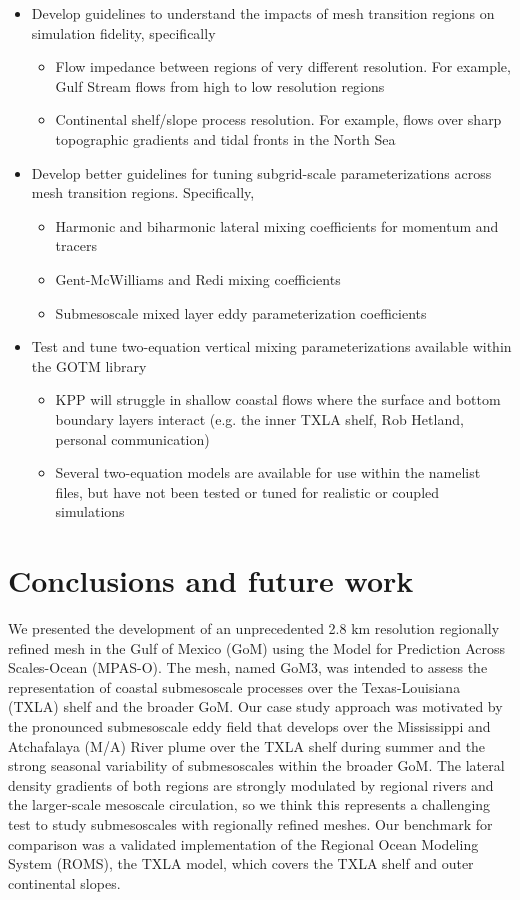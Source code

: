 \begin{itemize}
\begin{itemize}
    \end{itemize}
    \item Develop guidelines to understand the impacts of mesh transition regions on simulation fidelity, specifically
    \begin{itemize}
        \item Flow impedance between regions of very different resolution. For example, Gulf Stream flows from high to low resolution regions
        \item Continental shelf/slope process resolution. For example, flows over sharp topographic gradients and tidal fronts in the North Sea 
    \end{itemize}
    \item Develop better guidelines for tuning subgrid-scale parameterizations across mesh transition regions. Specifically, 
    \begin{itemize}
        \item Harmonic and biharmonic lateral mixing coefficients for momentum and tracers
        \item Gent-McWilliams and Redi mixing coefficients 
        \item Submesoscale mixed layer eddy parameterization coefficients
    \end{itemize}
    \item Test and tune two-equation vertical mixing parameterizations available within the GOTM library
    \begin{itemize}
        \item KPP will struggle in shallow coastal flows where the surface and bottom boundary layers interact (e.g. the inner TXLA shelf, Rob Hetland, personal communication)
        \item Several two-equation models are available for use within the namelist files, but have not been tested or tuned for realistic or coupled simulations
    \end{itemize}
\end{itemize}

\section{Conclusions and future work}
We presented the development of an unprecedented 2.8 km resolution regionally refined mesh in the Gulf of Mexico (GoM) using the Model for Prediction Across Scales-Ocean (MPAS-O). The mesh, named GoM3, was intended to assess the representation of coastal submesoscale processes over the Texas-Louisiana (TXLA) shelf and the broader GoM. Our case study approach was motivated by the pronounced submesoscale eddy field that develops over the Mississippi and Atchafalaya (M/A) River plume over the TXLA shelf during summer and the strong seasonal variability of submesoscales within the broader GoM. The lateral density gradients of both regions are strongly modulated by regional rivers and the larger-scale mesoscale circulation, so we think this represents a challenging test to study submesoscales with regionally refined meshes. Our benchmark for comparison was a validated implementation of the Regional Ocean Modeling System (ROMS), the TXLA model, which covers the TXLA shelf and outer continental slopes. 

